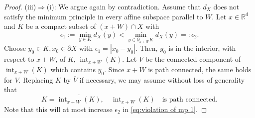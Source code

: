 \documentclass[a4paper,10pt]{amsart}
\newtheorem*{crucial lemma}{Lemma \ref{lem:nice polynomial2}}
\theoremstyle{definition}
\newcommand{\R}{\mathbb{R}}
\begin{document}
\begin{proof}
    (iii)$\Rightarrow$(i): We argue again by contradiction. Assume that $d_X$ does not satisfy the minimum principle in every affine subspace parallel to $W$. Let $x\in\R^d$ and $K$ be a compact subset of $(x+W)\cap X$ with
    \begin{equation}\label{eq:violation of mp 1}
        \epsilon_1:=\min_{y\in K}d_X(y)<\min_{y\in\partial_{x+W}K}d_X(y)=:\epsilon_2.
    \end{equation}
    Choose $y_0\in K,x_0\in\partial X$ with $\epsilon_1=|x_0-y_0|$. Then, $y_0$ is in the interior, with respect to $x+W$, of $K$, $\operatorname{int}_{x+W}(K)$. Let $V$ be the connected component of $\operatorname{int}_{x+W}(K)$ which contains $y_0$. Since $x+W$ is path connected, the same holds for $V$. Replacing $K$ by $\overline{V}$ if necessary, we may assume without loss of generality that
    \[K=\overline{\operatorname{int}_{x+W}(K)},\quad \operatorname{int}_{x+W}(K)\quad\text{is path connected.}\]
    Note that this will at most increase $\epsilon_2$ in \eqref{eq:violation of mp 1}.


\end{proof}
\end{document}
